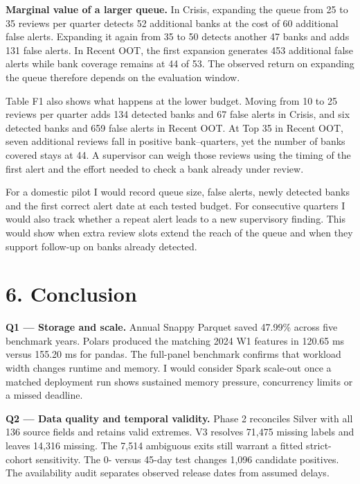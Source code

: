 \documentclass[
  12pt,
  a4paper,
]{article}
\renewcommand{\arraystretch}{1.16}
\begin{document}
\textbf{Marginal value of a larger queue.} In Crisis, expanding the
queue from 25 to 35 reviews per quarter detects 52 additional banks at
the cost of 60 additional false alerts. Expanding it again from 35 to 50
detects another 47 banks and adds 131 false alerts. In Recent OOT, the
first expansion generates 453 additional false alerts while bank
coverage remains at 44 of 53. The observed return on expanding the queue
therefore depends on the evaluation window.

Table F1 also shows what happens at the lower budget. Moving from 10 to
25 reviews per quarter adds 134 detected banks and 67 false alerts in
Crisis, and six detected banks and 659 false alerts in Recent OOT. At
Top 35 in Recent OOT, seven additional reviews fall in positive
bank--quarters, yet the number of banks covered stays at 44. A
supervisor can weigh those reviews using the timing of the first alert
and the effort needed to check a bank already under review.

For a domestic pilot I would record queue size, false alerts, newly
detected banks and the first correct alert date at each tested budget.
For consecutive quarters I would also track whether a repeat alert leads
to a new supervisory finding. This would show when extra review slots
extend the reach of the queue and when they support follow-up on banks
already detected.

\fontsize{11bp}{12.45bp}\selectfont
\setlength{\parskip}{2.9pt plus .55pt minus .3pt}
\renewcommand{\arraystretch}{1.10}

\section{6. Conclusion}\label{conclusion}

\textbf{Q1 --- Storage and scale.} Annual Snappy Parquet saved 47.99\%
across five benchmark years. Polars produced the matching 2024 W1
features in 120.65 ms versus 155.20 ms for pandas. The full-panel
benchmark confirms that workload width changes runtime and memory. I
would consider Spark scale-out once a matched deployment run shows
sustained memory pressure, concurrency limits or a missed deadline.

\textbf{Q2 --- Data quality and temporal validity.} Phase 2 reconciles
Silver with all 136 source fields and retains valid extremes. V3
resolves 71,475 missing labels and leaves 14,316 missing. The 7,514
ambiguous exits still warrant a fitted strict-cohort sensitivity. The 0-
versus 45-day test changes 1,096 candidate positives. The availability
audit separates observed release dates from assumed delays.
\end{document}
